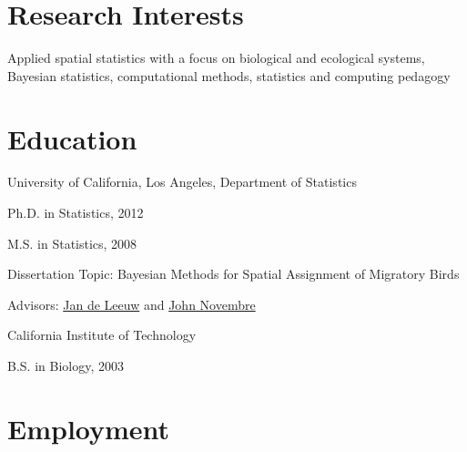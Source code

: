 \documentclass[margin,line]{res}
\begin{document}
\address{{\small 204 Old Chemistry Building $\bullet$ Department of Statistical Science, Duke University $\bullet$  Durham, NC 27708-0251}}
\address{{\small (310) 882-8854 $\bullet$ \href{mailto:rundel@gmail.com}{rundel@gmail.com} $\bullet$ \href{mailto:colin.rundel@stat.duke.edu}{colin.rundel@stat.duke.edu}}}


\begin{resume}

%

\vspace{3mm}

\section{\sc Research Interests}
Applied spatial statistics with a focus on biological and ecological systems, Bayesian statistics, computational methods, statistics and computing pedagogy

\vspace{4mm}

%

\section{\sc Education}
University of California, Los Angeles, Department of Statistics
\vspace{1mm}
\begin{list1}
\item[] Ph.D. in Statistics,  2012
\item[] M.S. in Statistics,  2008
\vspace{1mm}
\item[] Dissertation Topic:  Bayesian Methods for Spatial Assignment of Migratory Birds
\item[] Advisors:  \href{http://www.cuddyvalley.org}{Jan de Leeuw} and \href{http://www.eeb.ucla.edu/Faculty/Novembre/}{John Novembre}
\end{list1}

\vspace{-0.13cm}
California Institute of Technology
\vspace{1mm}
\begin{list1}
\item[] B.S. in Biology, 2003
\end{list1}

\vspace{4mm}

%

\section{\sc Employment}


\end{resume}
\end{document}
